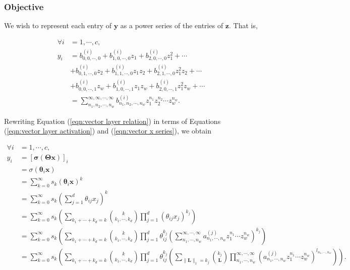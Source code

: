 \subsubsection{Objective}

We wish to represent each entry of $\mathbf{y}$ as a power series of the entries of $\mathbf{z}$. That is,

\begin{align}
    \forall i &= 1, \cdots, c, \nonumber \\ y_i
    &= b^{(i)}_{0,0,\cdots,0} + b^{(i)}_{1,0,\cdots,0} z_1 + b^{(i)}_{2,0,\cdots,0} z_1^2 + \cdots \nonumber \\
    &+ b^{(i)}_{0,1,\cdots,0} z_2 + b^{(i)}_{1,1,\cdots,0} z_1 z_2 + b^{(i)}_{2,1,\cdots,0} z_1^2 z_2 + \cdots \nonumber \\
    &+ b^{(i)}_{0,0,\cdots,1} z_w + b^{(i)}_{1,0,\cdots,1} z_1 z_w + b^{(i)}_{2,0,\cdots,1} z_1^2 z_w + \cdots \nonumber \\
    &= \sum_{n_1,n_2,\cdots,n_w}^{\infty,\infty,\cdots,\infty} b^{(i)}_{n_1,n_2,\cdots,n_w} z_1^{n_1} z_2^{n_2} \cdots z_w^{n_w}.
    \label{eqn:vector y series}
\end{align}

Rewriting Equation (\ref{eqn:vector layer relation}) in terms of Equations (\ref{eqn:vector layer activation}) and (\ref{eqn:vector x series}), we obtain

\begin{align}
    \forall i &= 1, \cdots, c, \nonumber \\ y_i
    &= \left[\mathbf{\sigma}(\mathbf{\Theta} \mathbf{x})\right]_i \nonumber \\
    &= \sigma(\mathbf{\theta}_i \mathbf{x}) \nonumber \\
    &= \sum_{k=0}^{\infty} s_k (\mathbf{\theta}_i \mathbf{x})^k \nonumber \\
    &= \sum_{k=0}^{\infty} s_k \left(\sum_{j=1}^{d} \theta_{ij} x_{j}\right)^k \nonumber \\
    &= \sum_{k=0}^{\infty} s_k \left(\sum_{k_1 + \cdots + k_d = k} \binom{k}{k_1, \cdots, k_d} \prod_{j=1}^{d} (\theta_{ij} x_j)^{k_j} \right) \nonumber \\
    &= \sum_{k=0}^{\infty} s_k \left(\sum_{k_1 + \cdots + k_d = k} \binom{k}{k_1, \cdots, k_d} \prod_{j=1}^{d}\theta_{ij}^{k_j} \left(\sum_{n_1, \cdots, n_w}^{\infty,
    \cdots, \infty} a^{(j)}_{n_1,\cdots,n_w} z_1^{n_1}  \cdots z_w^{n_w} \right)^{k_j}\right) \nonumber \\
    &= \sum_{k=0}^{\infty} s_k \left(\sum_{k_1 + \cdots + k_d = k} \binom{k}{k_1, \cdots, k_d} \prod_{j=1}^{d} \theta_{ij}^{k_j} \left(\sum_{\lVert \mathbf{L} \rVert_1 = k_j} \binom{k_j}{\mathbf{L}} \prod_{n_1, \cdots, n_w}^{\infty, \cdots, \infty} (a^{(j)}_{n_1, \cdots, n_w} z_1^{n_1} \cdots z_w^{n_w})^{l_{n_1, \cdots, n_w}} \right)\right). \nonumber \\
    \label{eqn:vector y expansion}
\end{align}

